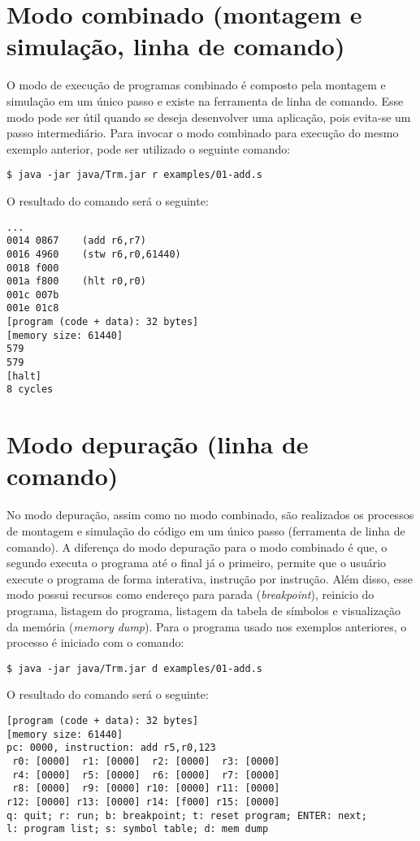 \documentclass[11pt,a4paper]{report}
\begin{document}
\section{Modo combinado (montagem e simulação, linha de comando)}

O modo de execução de programas combinado é composto pela montagem e
simulação em um único passo e existe na ferramenta de linha de comando.
Esse modo pode ser útil quando se deseja desenvolver uma aplicação, pois
evita-se um passo intermediário. Para invocar o modo combinado para
execução do mesmo exemplo anterior, pode ser utilizado o seguinte comando:

\begin{verbatim}
$ java -jar java/Trm.jar r examples/01-add.s
\end{verbatim}

O resultado do comando será o seguinte:

\begin{verbatim}
...
0014 0867    (add r6,r7)
0016 4960    (stw r6,r0,61440)
0018 f000
001a f800    (hlt r0,r0)
001c 007b
001e 01c8
[program (code + data): 32 bytes]
[memory size: 61440]
579
579
[halt]
8 cycles
\end{verbatim}

\section{Modo depuração (linha de comando)}

No modo depuração, assim como no modo combinado, são realizados os
processos de montagem e simulação do código em um único passo (ferramenta
de linha de comando). A diferença do modo depuração para o modo combinado
é que, o segundo executa o programa até o final já o primeiro, permite
que o usuário execute o programa de forma interativa, instrução por
instrução. Além disso, esse modo possui recursos como endereço para parada
(\textit{breakpoint}), reinicio do programa, listagem do programa,
listagem da tabela de símbolos e visualização da memória (\textit{memory
dump}). Para o programa usado nos exemplos anteriores, o processo é
iniciado com o comando:

\begin{verbatim}
$ java -jar java/Trm.jar d examples/01-add.s
\end{verbatim}

O resultado do comando será o seguinte:

\begin{verbatim}
[program (code + data): 32 bytes]
[memory size: 61440]
pc: 0000, instruction: add r5,r0,123
 r0: [0000]  r1: [0000]  r2: [0000]  r3: [0000]
 r4: [0000]  r5: [0000]  r6: [0000]  r7: [0000]
 r8: [0000]  r9: [0000] r10: [0000] r11: [0000]
r12: [0000] r13: [0000] r14: [f000] r15: [0000]
q: quit; r: run; b: breakpoint; t: reset program; ENTER: next;
l: program list; s: symbol table; d: mem dump
\end{verbatim}
\end{document}
